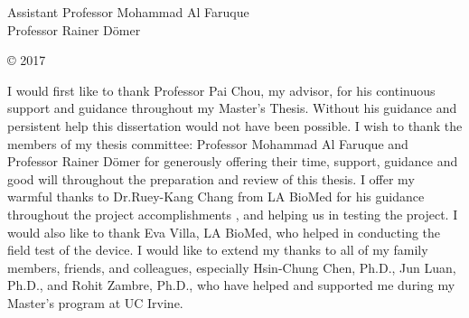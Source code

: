 



\othercommitteemembers
{
  Assistant Professor Mohammad Al Faruque\\
  Professor Rainer D{\"o}mer
}


\copyrightdeclaration
{
  {\copyright} {2017} \Authorname
}


  

\acknowledgments
{
  I would first like to thank Professor Pai Chou, my advisor, for his continuous support and guidance throughout my Master's Thesis. Without his guidance and persistent help this dissertation would not have been possible. I wish to thank the members of my thesis committee: Professor Mohammad Al Faruque and Professor Rainer D{\"o}mer for generously offering their time, support, guidance and good will throughout the preparation and review of this thesis. I offer my warmful thanks to Dr.Ruey-Kang Chang  from LA BioMed for his guidance throughout the project accomplishments , and helping us in testing the project. I would also like to thank Eva Villa, LA BioMed, who helped in conducting the field test of the device. I would like to extend my thanks to all of my family members, friends, and colleagues, especially  Hsin-Chung Chen, Ph.D., Jun Luan, Ph.D., and Rohit Zambre, Ph.D., who have helped and supported me during my Master's program at UC Irvine.   
}



